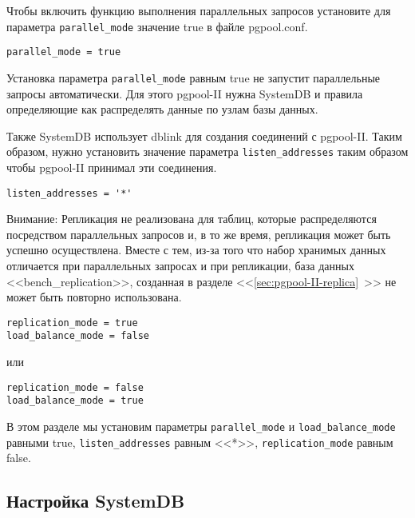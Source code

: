 Чтобы включить функцию выполнения параллельных запросов установите для параметра \lstinline!parallel_mode! значение true в файле pgpool.conf.

\begin{lstlisting}[label=lst:pgpool22,caption=Настройка параллельного запроса]
parallel_mode = true
\end{lstlisting}

Установка параметра \lstinline!parallel_mode! равным true не запустит параллельные запросы автоматически. Для этого pgpool-II нужна SystemDB и правила определяющие как распределять данные по узлам базы данных.

Также SystemDB использует dblink для создания соединений с pgpool-II. Таким образом, нужно установить значение параметра \lstinline!listen_addresses! таким образом чтобы pgpool-II принимал эти соединения.

\begin{lstlisting}[label=lst:pgpool23,caption=Настройка параллельного запроса]
listen_addresses = '*'
\end{lstlisting}

Внимание: Репликация не реализована для таблиц, которые распределяются посредством параллельных запросов и, в то же время, репликация может быть успешно осуществлена. Вместе с тем, из-за того что набор хранимых данных отличается при параллельных запросах и при репликации, база данных <<bench\_replication>>, созданная в разделе <<\ref{sec:pgpool-II-replica}~>> не может быть повторно использована.

\begin{lstlisting}[label=lst:pgpool24,caption=Настройка параллельного запроса]
replication_mode = true
load_balance_mode = false
\end{lstlisting}

или

\begin{lstlisting}[label=lst:pgpool25,caption=Настройка параллельного запроса]
replication_mode = false
load_balance_mode = true
\end{lstlisting}

В этом разделе мы установим параметры \lstinline!parallel_mode! и \lstinline!load_balance_mode! равными true, \lstinline!listen_addresses! равным <<*>>, \lstinline!replication_mode! равным false.


\subsection{Настройка SystemDB}

